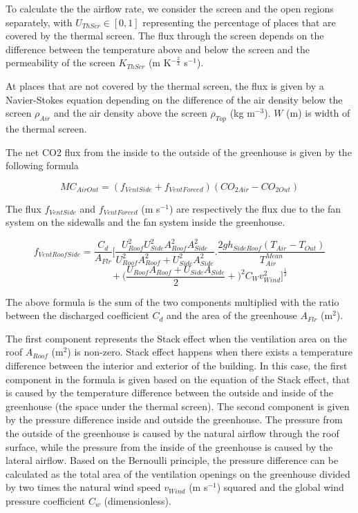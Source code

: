 \documentclass[a4paper]{article}
\begin{document}
To calculate the the airflow rate, we consider the screen and the open regions separately, with $U_{ThScr} \in [0,1]$ representing the percentage of places that are covered by the thermal screen. The flux through the screen depends on the difference between the temperature above and below the screen and the permeability of the screen $K_{ThScr}$ (m K$^{-\frac{2}{3}}$ s$^{-1}$).

At places that are not covered by the thermal screen, the flux is given by a Navier-Stokes equation depending on the difference of the air density below the screen $\rho_{Air}$ and the air density above the screen $\rho_{Top}$ (kg m$^{-3}$). $W$ (m) is width of the thermal screen.

The net CO2 flux from the inside to the outside of the greenhouse is given by the following formula

\begin{equation}
  MC_{AirOut} = (f_{VentSide} + f_{VentForced})(CO_{2 Air} - CO_{2 Out})
\end{equation}

The flux $f_{VentSide}$ and $f_{VentForced}$ (m s$^{-1}$) are respectively the flux due to the fan system on the sidewalls and the fan system inside the greenhouse.


$$ f_{VentRoofSide} = \frac{C_d}{A_{Flr}} \Bigg[\frac{U^2_{Roof}U^2_{Side} A^2_{Roof}A^2_{Side}}{U^2_{Roof} A^2_{Roof} + U^2_{Side} A^2_{Side}} . \frac{2gh_{SideRoof} (T_{Air} - T_{Out})}{T^{Mean}_{Air}}$$
$$\qquad \qquad + \Bigg( \frac{U_{Roof}A_{Roof} + U_{Side}A_{Side}}{2} +  \Bigg) ^2 C_W v^2_{Wind} \Bigg]^{\frac{1}{2}}$$

The above formula is the sum of the two components multiplied with the ratio between the discharged coefficient $C_d$ and the area of the greenhouse $A_{Flr}$ (m$^2$).

The first component represents the Stack effect when the ventilation area on the roof $A_{Roof}$ (m$^2$) is non-zero. Stack effect happens when there exists a temperature difference between the interior and exterior of the building. In this case, the first component in the formula is given based on the equation of the Stack effect, that is caused by the temperature difference between the outside and inside of the greenhouse (the space under the thermal screen).
The second component is given by the pressure difference inside and outside the greenhouse. The pressure from the outside of the greenhouse is caused by the natural airflow through the roof surface, while the pressure from the inside of the greenhouse is caused by the lateral airflow. Based on the Bernoulli principle, the pressure difference can be calculated as the total area of the ventilation openings on the greenhouse divided by two times the natural wind speed $v_{Wind}$ (m s$^{-1}$) squared and the global wind pressure coefficient $C_w$ (dimensionless).
\end{document}
